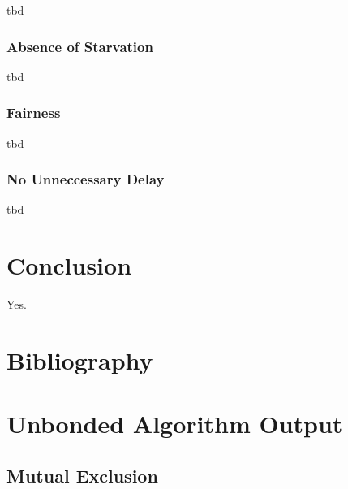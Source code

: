 \documentclass{llncs}
\begin{document}
tbd

\subsubsection{Absence of Starvation}

tbd

\subsubsection{Fairness}

tbd

\subsubsection{No Unneccessary Delay}

tbd

\section{Conclusion}

Yes.

\section{Bibliography}




\appendix

\section{Unbonded Algorithm Output}

\subsection{Mutual Exclusion \label{mc:app:unb:mutex}}
\end{document}
